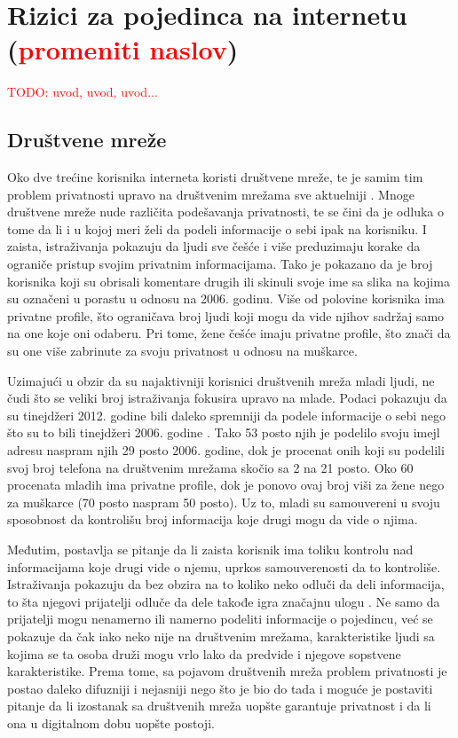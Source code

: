 \documentclass[a4paper]{article}
\newcommand\todos[1]{\textcolor{red}{#1}}
\begin{document}
\section{Rizici za pojedinca na internetu (\todos{promeniti naslov})}
\label{sec:trecePoglavlje}
\todos{TODO: uvod, uvod, uvod...}
\\
\subsection{Društvene mreže}
Oko dve trećine korisnika interneta koristi društvene mreže, te je samim tim problem privatnosti upravo na društvenim mrežama sve aktuelniji \cite{sm1}. Mnoge društvene mreže nude različita podešavanja privatnosti, te se čini da je odluka o tome da li i u kojoj meri želi da podeli informacije o sebi ipak na korisniku. I zaista, istraživanja pokazuju da ljudi sve češće i više preduzimaju korake da ograniče pristup svojim privatnim informacijama. Tako je pokazano da je broj korisnika koji su obrisali komentare drugih ili skinuli svoje ime sa slika na kojima su označeni u porastu u odnosu na 2006. godinu. Više od polovine korisnika ima privatne profile, što ograničava broj ljudi koji mogu da vide njihov sadržaj samo na one koje oni odaberu. Pri tome, žene češće imaju privatne profile, što znači da su one više zabrinute za svoju privatnost u odnosu na muškarce.
\par Uzimajući u obzir da su najaktivniji korisnici društvenih mreža mladi ljudi, ne čudi što se veliki broj istraživanja fokusira upravo na mlade. Podaci pokazuju da su tinejdžeri 2012. godine bili daleko spremniji da podele informacije o sebi nego što su to bili tinejdžeri 2006. godine \cite{sm2}. Tako 53 posto njih je podelilo svoju imejl adresu naspram njih 29 posto 2006. godine, dok je procenat onih koji su podelili svoj broj telefona na društvenim mrežama skočio sa 2 na 21 posto. Oko 60 procenata mladih ima privatne profile, dok je ponovo ovaj broj viši za žene nego za muškarce (70 posto naspram 50 posto). Uz to, mladi su samouvereni u svoju sposobnost da kontrolišu broj informacija koje drugi mogu da vide o njima.
\par Međutim, postavlja se pitanje da li zaista korisnik ima toliku kontrolu nad informacijama koje drugi vide o njemu, uprkos samouverenosti da to kontroliše. Istraživanja pokazuju da bez obzira na to koliko neko odluči da deli informacija, to šta njegovi prijatelji odluče da dele takođe igra značajnu ulogu \cite{sm3}. Ne samo da prijatelji mogu nenamerno ili namerno podeliti informacije o pojedincu, već se pokazuje da čak iako neko nije na društvenim mrežama, karakteristike ljudi sa kojima se ta osoba druži mogu vrlo lako da predvide i njegove sopstvene karakteristike. Prema tome, sa pojavom društvenih mreža problem privatnosti je postao daleko difuzniji i nejasniji nego što je bio do tada i moguće je postaviti pitanje da li izostanak sa društvenih mreža uopšte garantuje privatnost i da li ona u digitalnom dobu uopšte postoji.
\end{document}

